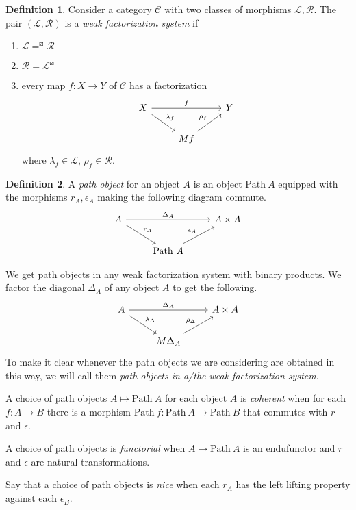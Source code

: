 \documentclass{article}
\theoremstyle{definition}
\newtheorem{definition}{Definition}[section]
\newcommand{\C}{\mathcal C}
\newcommand{\Path}{\mathrm {Path} \ }
\begin{document}
\begin{definition}
    Consider a category $\C$ with two classes of morphisms $\mathcal L, \mathcal R$. The pair $(\mathcal L, \mathcal R)$ is a \emph{weak factorization system} if
    \begin{enumerate}
        \item $\mathcal L = ^\boxslash \mathcal R$
        \item $\mathcal R = \mathcal L^\boxslash$
        \item every map $f: X \to Y$ of $\C$ has a factorization
        \[
             \begin{tikzcd}
                 X \ar[dr, "\lambda_f"] \ar[rr,"f"]& & Y \\
                   & Mf \ar[ur,"\rho_f"]
             \end{tikzcd}
        \]
        where $\lambda_f \in \mathcal L$, $\rho_f \in \mathcal R$.
    \end{enumerate}
\end{definition}

\begin{definition}
    A \emph{path object} for an object $A$ is an object $\Path A$ equipped with the morphisms $r_A, \epsilon_A$ making the following diagram commute.
    \[
             \begin{tikzcd}
                 A \ar[dr, "r_A"] \ar[rr,"\Delta_A"]& & A \times A \\
                   & \Path A \ar[ur,"\epsilon_A"]
             \end{tikzcd}
        \]

    We get path objects in any weak factorization system with binary products. We factor the diagonal $\Delta_A$ of any object $A$ to get the following.
    \[
             \begin{tikzcd}
                 A \ar[dr, "\lambda_\Delta"] \ar[rr,"\Delta_A"]& & A \times A \\
                   & M\Delta_A \ar[ur,"\rho_\Delta"]
             \end{tikzcd}
        \]
    To make it clear whenever the path objects we are considering are obtained in this way, we will call them \emph{path objects in a/the weak factorization system}.

    A choice of path objects $A \mapsto \Path A$ for each object $A$ is \emph{coherent} when for each $f: A \to B$ there is a morphism $\Path f : \Path A \to \Path B$ that commutes with $r$ and $\epsilon$.

    A choice of path objects is \emph{functorial} when $A \mapsto \Path A$ is an endufunctor and $r$ and $\epsilon$ are natural transformations.

    Say that a choice of path objects is \emph{nice} when each $r_A$ has the left lifting property against each $\epsilon_B$.
\end{definition}
\end{document}
